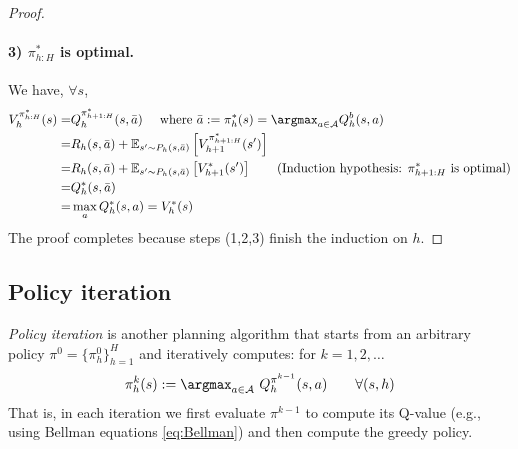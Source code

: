 \begin{proof}
\paragraph{3) $\pi^*_{h:H}$ is optimal.}
We have, $\forall s$,
\begin{align*}
V_h^{\pi_{h:H}^*}(s)
=& Q_h^{\pi^*_{h+1: H}}(s, \bar{a}) \quad \text { where } \bar{a}:=\pi_h^*(s)=\argmax_{a\in\mathcal{A}} Q_h^b(s, a) \\
=& R_h(s, \bar{a})+\mathbb{E}_{s' \sim P_h(s, \bar{a})}\left[V_{h+1}^{\pi_{h+1: H}^*}(s')\right]\\
=& R_h(s, \bar{a})+\mathbb{E}_{s' \sim P_h(s, \bar{a})}\left[V_{h+1}^{*}(s')\right] \qquad\text{(Induction hypothesis: $\pi_{h+1: H}^*$ is optimal)}\\
= &Q_h^*(s, \bar{a}) \\
= &\max_a Q_h^*(s, a) = V^*_h(s)
\end{align*}
The proof completes because steps (1,2,3) finish the induction on $h$.
\end{proof}

\subsection{Policy iteration}
{\em Policy iteration} is another planning algorithm that starts from an arbitrary policy $\pi^0=\{\pi^0_h\}_{h=1}^H$ and iteratively computes: for $k=1,2,\ldots$
\begin{align*}
    \pi^k_h(s) := \argmax_{a\in\mathcal{A}} ~ Q^{\pi^{k-1}}_h(s,a) \qquad \forall (s,h)
\end{align*}
That is, in each iteration we first evaluate $\pi^{k-1}$ to compute its Q-value (e.g., using Bellman equations \eqref{eq:Bellman}) and then compute the greedy policy.

